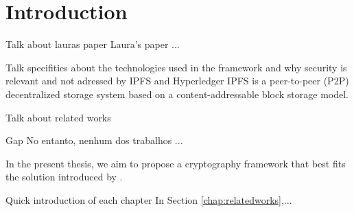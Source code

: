\documentclass[cic,tc,english]{iiufrgs}
\begin{document}
\tableofcontents

\clearpage
{}

\chapter{Introduction}
    \label{chap:introduction}
    \begin{draft}{Talk about lauras paper}
        Laura's paper ...
    \end{draft}


    \begin{draft}{Talk specifities about the technologies used in the framework and why security is relevant and not adressed by IPFS and Hyperledger}
        IPFS \cite{benet2013ipfs} is a peer-to-peer (P2P) decentralized storage system based on a content-addressable block storage model.
    \end{draft}

    \begin{draft}{Talk about related works}
        
    \end{draft}

    \begin{draft}{Gap}
        No entanto, nenhum dos trabalhos ...
    \end{draft}


    In the present thesis, we aim to propose a cryptography framework that best fits the solution introduced by \citet{laura2023}.


    \begin{draft}{Quick introduction of each chapter}
        In Section \ref{chap:relatedworks},...

    \end{draft}
\end{document}
